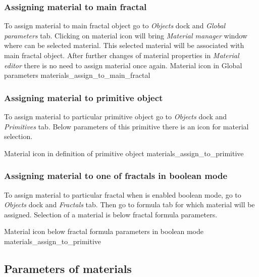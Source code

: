 \subsubsection{Assigning material to main fractal}\label{assigning-material-to-main-fractal}

To assign material to main fractal object go to \emph{Objects} dock and \emph{Global parameters} tab. Clicking on material icon will bring \emph{Material manager} window where can be selected material. This selected material will be associated with main fractal object. After further changes of material properties in \emph{Material editor} there is no need to assign material once again.
\nopagebreak
{}
{Material icon in Global parameters}
{materials_assign_to_main_fractal}

\subsubsection{Assigning material to primitive object}\label{assigning-material-to-primitive}

To assign material to particular primitive object go to \emph{Objects} dock and \emph{Primitives} tab. Below parameters of this primitive there is an icon for material selection.
 
\nopagebreak
{}
{Material icon in definition of primitive object}
{materials_assign_to_primitive}

\subsubsection{Assigning material to one of fractals in boolean mode}\label{assigning-material-to-boolean}

To assign material to particular fractal when is enabled boolean mode, go to \emph{Objects} dock and \emph{Fractals} tab. Then go to formula tab for which material will be assigned. Selection of a material is below fractal formula parameters.

\nopagebreak
{}
{Material icon below fractal formula parameters in boolean mode}
{materials_assign_to_primitive}

\subsection{Parameters of materials}\label{materials-parameters}

